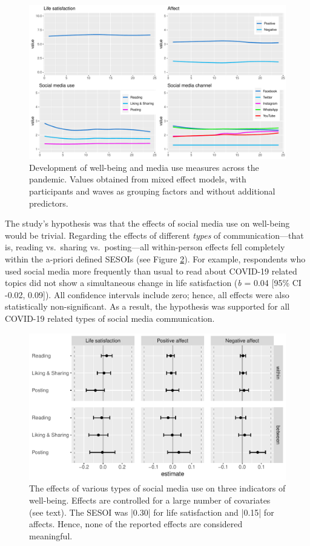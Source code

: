 \documentclass[
  english,
  man,mask,floatsintext]{apa6}
\begin{document}
\begin{figure}
\includegraphics[width=\textwidth]{figures/fig_descriptives} \caption{Development of well-being and media use measures across the pandemic. Values obtained from mixed effect models, with participants and waves as grouping factors and without additional predictors.}\label{fig:fig-desc}
\end{figure}

The study's hypothesis was that the effects of social media use on well-being would be trivial.
Regarding the effects of different \emph{types} of communication---that is, reading vs.~sharing vs.~posting---all within-person effects fell completely within the a-priori defined SESOIs (see Figure \ref{fig:res-activity}).
For example, respondents who used social media more frequently than usual to read about COVID-19 related topics did not show a simultaneous change in life satisfaction (\emph{b} = 0.04 {[}95\% CI -0.02, 0.09{]}).
All confidence intervals include zero; hence, all effects were also statistically non-significant.
As a result, the hypothesis was supported for all COVID-19 related types of social media communication.

\begin{figure}
\includegraphics[width=\textwidth]{figures/fig_results_activity} \caption{The effects of various types of social media use on three indicators of well-being. Effects are controlled for a large number of covariates (see text). The SESOI was |0.30| for life satisfaction and |0.15| for affects. Hence, none of the reported effects are considered meaningful.}\label{fig:res-activity}
\end{figure}
\end{document}
